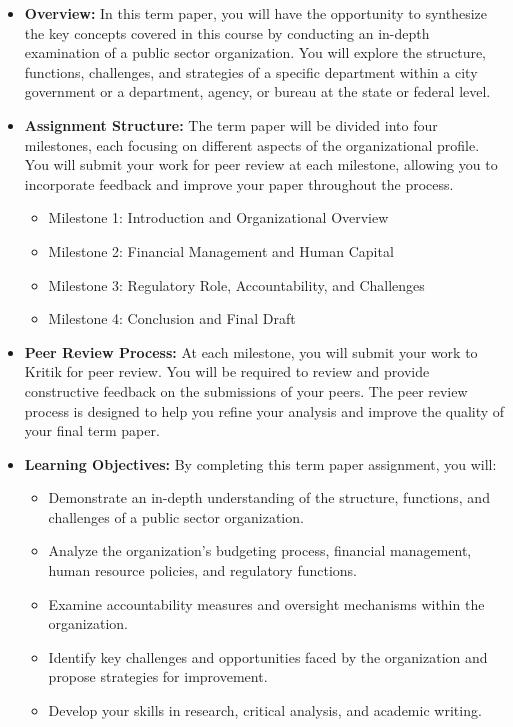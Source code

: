 \documentclass[11pt, letterpaper]{article}
\begin{document}
\begin{itemize}
    \item \textbf{Overview:} In this term paper, you will have the opportunity to synthesize the key concepts covered in this course by conducting an in-depth examination of a public sector organization. You will explore the structure, functions, challenges, and strategies of a specific department within a city government or a department, agency, or bureau at the state or federal level.
    \item \textbf{Assignment Structure:} The term paper will be divided into four milestones, each focusing on different aspects of the organizational profile. You will submit your work for peer review at each milestone, allowing you to incorporate feedback and improve your paper throughout the process.
    \begin{itemize}
        \item Milestone 1: Introduction and Organizational Overview
        \item Milestone 2: Financial Management and Human Capital
        \item Milestone 3: Regulatory Role, Accountability, and Challenges
        \item Milestone 4: Conclusion and Final Draft
    \end{itemize}
    \item \textbf{Peer Review Process:} At each milestone, you will submit your work to Kritik for peer review. You will be required to review and provide constructive feedback on the submissions of your peers. The peer review process is designed to help you refine your analysis and improve the quality of your final term paper.
    \item \textbf{Learning Objectives:} By completing this term paper assignment, you will:
        \begin{itemize}
            \item Demonstrate an in-depth understanding of the structure, functions, and challenges of a public sector organization.
            \item Analyze the organization's budgeting process, financial management, human resource policies, and regulatory functions.
            \item Examine accountability measures and oversight mechanisms within the organization.
            \item Identify key challenges and opportunities faced by the organization and propose strategies for improvement.
            \item Develop your skills in research, critical analysis, and academic writing.

\end{itemize}
\end{itemize}
\end{document}
